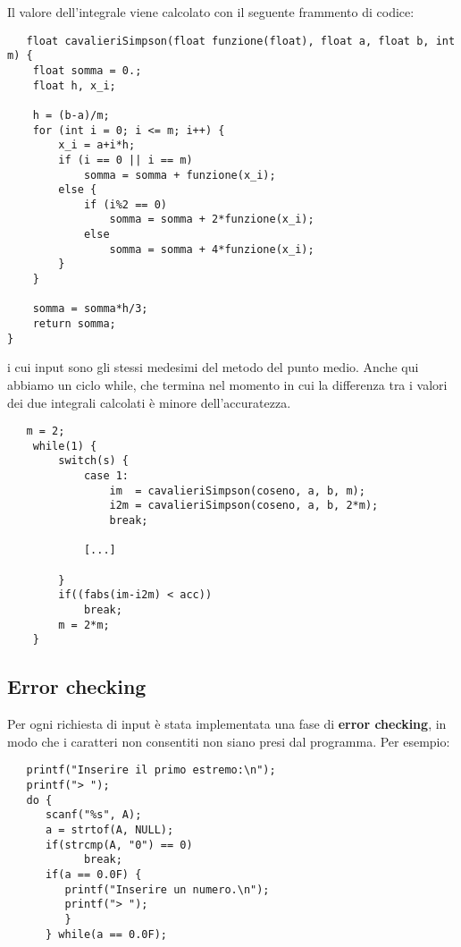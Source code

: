 \documentclass{article}
\begin{document}
Il valore dell'integrale viene calcolato con il seguente frammento di codice:
\begin{lstlisting}
   float cavalieriSimpson(float funzione(float), float a, float b, int m) {
    float somma = 0.;
    float h, x_i;

    h = (b-a)/m;
    for (int i = 0; i <= m; i++) {
        x_i = a+i*h;
        if (i == 0 || i == m)
            somma = somma + funzione(x_i);
        else {
            if (i%2 == 0)
                somma = somma + 2*funzione(x_i); 
            else
                somma = somma + 4*funzione(x_i);
        }
    }

    somma = somma*h/3;
    return somma;
}
\end{lstlisting}
i cui input sono gli stessi medesimi del metodo del punto medio. Anche qui abbiamo un ciclo while, che termina nel momento in cui la differenza tra i valori dei due integrali calcolati è 
minore dell'accuratezza.
\begin{lstlisting}
   m = 2;
    while(1) {
        switch(s) {
            case 1:
                im  = cavalieriSimpson(coseno, a, b, m);
                i2m = cavalieriSimpson(coseno, a, b, 2*m);
                break;

            [...]

        }  
        if((fabs(im-i2m) < acc))
            break;
        m = 2*m;
    }
\end{lstlisting}

\subsection{Error checking}
Per ogni richiesta di input è stata implementata una fase di \textbf{error checking}, in modo che i caratteri non consentiti non siano presi dal programma. Per esempio:
\begin{lstlisting}
   printf("Inserire il primo estremo:\n");
   printf("> ");
   do {
      scanf("%s", A);
      a = strtof(A, NULL);
      if(strcmp(A, "0") == 0)
            break;
      if(a == 0.0F) {
         printf("Inserire un numero.\n");
         printf("> ");
         }
      } while(a == 0.0F);
\end{lstlisting}
\end{document}
